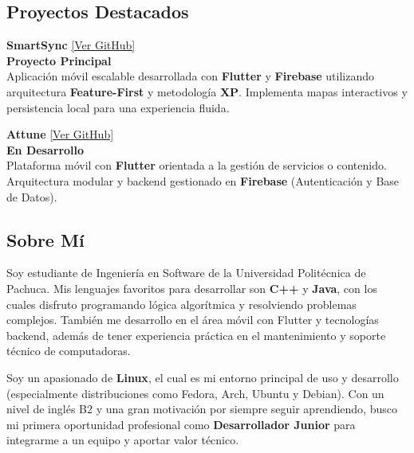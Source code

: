 \documentclass[10pt,a4paper]{article}
\begin{document}
\begin{minipage}[t]{0.48\textwidth}

\begin{tcolorbox}[cvcard]
\section*{Proyectos Destacados}

\textbf{\large SmartSync} \href{https://github.com/CodeMakeSoft/SS.git}{\normalsize [Ver GitHub]}\\[0.1em]
{\color{accent} \bfseries Proyecto Principal}\\[0.2em]
{\color{textmuted} Aplicación móvil escalable desarrollada con \textbf{Flutter} y \textbf{Firebase} utilizando arquitectura \textbf{Feature-First} y metodología \textbf{XP}. Implementa mapas interactivos y persistencia local para una experiencia fluida.}

\vspace{1em}
\textbf{\large Attune} \href{https://github.com/CodeMakeSoft/Attune.git}{\normalsize [Ver GitHub]}\\[0.1em]
{\color{accent} \bfseries En Desarrollo}\\[0.2em]
{\color{textmuted} Plataforma móvil con \textbf{Flutter} orientada a la gestión de servicios o contenido. Arquitectura modular y backend gestionado en \textbf{Firebase} (Autenticación y Base de Datos).}
\end{tcolorbox}

\vspace{1em}

\begin{tcolorbox}[cvcard]
\section*{Sobre Mí}
{\color{textmuted}
Soy estudiante de Ingeniería en Software de la Universidad Politécnica de Pachuca. Mis lenguajes favoritos para desarrollar son \textbf{C++} y \textbf{Java}, con los cuales disfruto programando lógica algorítmica y resolviendo problemas complejos. También me desarrollo en el área móvil con Flutter y tecnologías backend, además de tener experiencia práctica en el mantenimiento y soporte técnico de computadoras.

Soy un apasionado de \textbf{Linux}, el cual es mi entorno principal de uso y desarrollo (especialmente distribuciones como Fedora, Arch, Ubuntu y Debian). Con un nivel de inglés B2 y una gran motivación por siempre seguir aprendiendo, busco mi primera oportunidad profesional como \textbf{Desarrollador Junior} para integrarme a un equipo y aportar valor técnico.
}
\end{tcolorbox}

\end{minipage}
\end{document}
